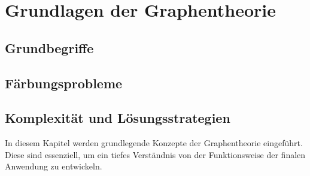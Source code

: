 
\newpage
\section{Grundlagen der Graphentheorie}
\subsection{Grundbegriffe}
\subsection{Färbungsprobleme}
\subsection{Komplexität und Lösungsstrategien}


In diesem Kapitel werden grundlegende Konzepte der Graphentheorie eingeführt. Diese sind essenziell, um ein tiefes Verständnis von der Funktionsweise der finalen Anwendung zu entwickeln.

